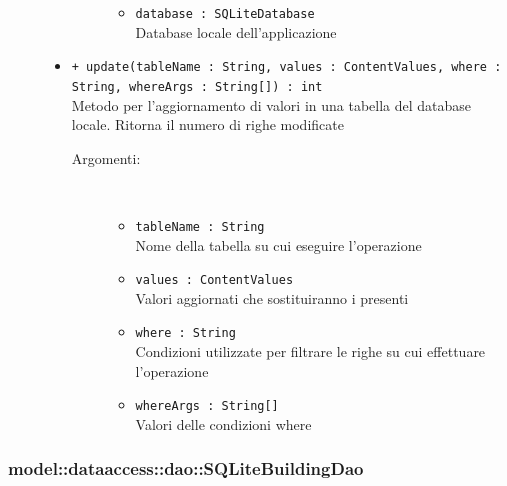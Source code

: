 \documentclass[../DefinizioneDiProdotto.tex]{subfiles}
\begin{document}
\begin{description}
\begin{itemize}
\begin{description}
\begin{itemize}
\item \texttt{database : SQLiteDatabase}\\
Database locale dell'applicazione\end{itemize}
\end{description}
\item \texttt{+ update(tableName : String, values : ContentValues, where : String, whereArgs : String[]) : int}\\
Metodo per l'aggiornamento di valori in una tabella del database locale. Ritorna il numero di righe modificate 
 \begin{description}
\item[Argomenti:] \
\begin{itemize}
\item \texttt{tableName : String}\\
Nome della tabella su cui eseguire l'operazione\item \texttt{values : ContentValues}\\
Valori aggiornati che sostituiranno i presenti\item \texttt{where : String}\\
Condizioni utilizzate per filtrare le righe su cui effettuare l'operazione\item \texttt{whereArgs : String[]}\\
Valori delle condizioni where\end{itemize}
\end{description}
\end{itemize}
\end{description}

\subsubsection{model::dataaccess::dao::SQLiteBuildingDao}
\end{document}
